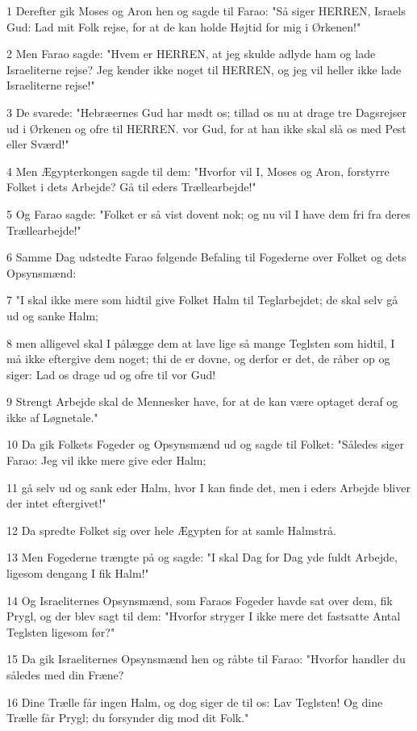 \par 1 Derefter gik Moses og Aron hen og sagde til Farao: "Så siger HERREN, Israels Gud: Lad mit Folk rejse, for at de kan holde Højtid for mig i Ørkenen!"
\par 2 Men Farao sagde: "Hvem er HERREN, at jeg skulde adlyde ham og lade Israeliterne rejse? Jeg kender ikke noget til HERREN, og jeg vil heller ikke lade Israeliterne rejse!"
\par 3 De svarede: "Hebræernes Gud har mødt os; tillad os nu at drage tre Dagsrejser ud i Ørkenen og ofre til HERREN. vor Gud, for at han ikke skal slå os med Pest eller Sværd!"
\par 4 Men Ægypterkongen sagde til dem: "Hvorfor vil I, Moses og Aron, forstyrre Folket i dets Arbejde? Gå til eders Trællearbejde!"
\par 5 Og Farao sagde: "Folket er så vist dovent nok; og nu vil I have dem fri fra deres Trællearbejde!"
\par 6 Samme Dag udstedte Farao følgende Befaling til Fogederne over Folket og dets Opsynsmænd:
\par 7 "I skal ikke mere som hidtil give Folket Halm til Teglarbejdet; de skal selv gå ud og sanke Halm;
\par 8 men alligevel skal I pålægge dem at lave lige så mange Teglsten som hidtil, I må ikke eftergive dem noget; thi de er dovne, og derfor er det, de råber op og siger: Lad os drage ud og ofre til vor Gud!
\par 9 Strengt Arbejde skal de Mennesker have, for at de kan være optaget deraf og ikke af Løgnetale."
\par 10 Da gik Folkets Fogeder og Opsynsmænd ud og sagde til Folket: "Således siger Farao: Jeg vil ikke mere give eder Halm;
\par 11 gå selv ud og sank eder Halm, hvor I kan finde det, men i eders Arbejde bliver der intet eftergivet!"
\par 12 Da spredte Folket sig over hele Ægypten for at samle Halmstrå.
\par 13 Men Fogederne trængte på og sagde: "I skal Dag for Dag yde fuldt Arbejde, ligesom dengang I fik Halm!"
\par 14 Og Israeliternes Opsynsmænd, som Faraos Fogeder havde sat over dem, fik Prygl, og der blev sagt til dem: "Hvorfor stryger I ikke mere det fastsatte Antal Teglsten ligesom før?"
\par 15 Da gik Israeliternes Opsynsmænd hen og råbte til Farao: "Hvorfor handler du således med din Fræne?
\par 16 Dine Trælle får ingen Halm, og dog siger de til os: Lav Teglsten! Og dine Trælle får Prygl; du forsynder dig mod dit Folk."
